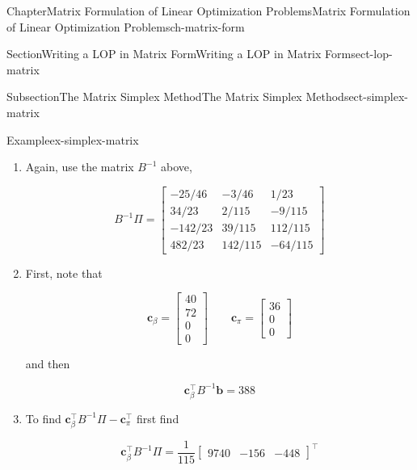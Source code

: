 \documentclass[oneside,10pt,]{book}
\numberwithin{equation}{section}
\newcommand{\amp}{&}
\begin{document}
\begin{chapterptx}{Chapter}{Matrix Formulation of Linear Optimization Problems}{}{Matrix Formulation of Linear Optimization Problems}{}{}{ch-matrix-form}
\begin{sectionptx}{Section}{Writing a LOP in Matrix Form}{}{Writing a LOP in Matrix Form}{}{}{sect-lop-matrix}
\begin{subsectionptx}{Subsection}{The Matrix Simplex Method}{}{The Matrix Simplex Method}{}{}{sect-simplex-matrix}
\begin{example}{Example}{}{ex-simplex-matrix}
\begin{enumerate}
\par
%
\begin{equation*}
B^{-1} \boldsymbol{b} = \begin{bmatrix} 5/2 \\ 4 \\ 153 \\114 \end{bmatrix}
\end{equation*}
%
\item{}Again, use the matrix \(B^{-1}\) above,%
\par
%
\begin{equation*}
B^{-1} \Pi = \begin{bmatrix} -25/46 \amp   -3/46 \amp    1/23 \\ 34/23 \amp  2/115  \amp -9/115 \\ -142/23 \amp  39/115 \amp  112/115 \\ 482/23 \amp 142/115 \amp -64/115 \end{bmatrix}
\end{equation*}
%
\item{}First, note that%
\par
%
\begin{equation*}
\boldsymbol{c}_{\beta} = \begin{bmatrix} 40 \\ 72 \\ 0 \\ 0 \end{bmatrix} \qquad \boldsymbol{c}_{\pi} = \begin{bmatrix} 36 \\ 0 \\ 0 \end{bmatrix}
\end{equation*}
%
\par
and then%
\par
%
\begin{equation*}
\boldsymbol{c}_{\beta}^{\intercal}B^{-1}\boldsymbol{b} = 388
\end{equation*}
%
\item{}To find \(\boldsymbol{c}_{\beta}^{\intercal}B^{-1}\Pi - \boldsymbol{c}_{\pi}^{\intercal}\) first find%
\par
%
\begin{equation*}
\boldsymbol{c}_{\beta}^{\intercal}B^{-1}\Pi  = \frac{1}{115}\begin{bmatrix} 9740 \amp  -156 \amp  -448 \end{bmatrix}^{\intercal}
\end{equation*}

\end{enumerate}
\end{example}
\end{subsectionptx}
\end{sectionptx}
\end{chapterptx}
\end{document}
